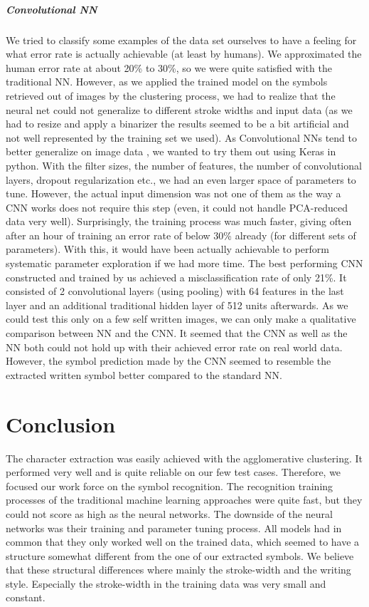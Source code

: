 \documentclass[twocolumn]{article}%
\begin{document}
	\subparagraph{Convolutional NN}
	We tried to classify some examples of the data set ourselves to have a feeling for what error rate is actually achievable (at least by humans). We approximated the human error rate at about 20\% to 30\%, so we were quite satisfied with the traditional NN. However, as we applied the trained model on the symbols retrieved out of images by the clustering process, we had to realize that the neural net could not generalize to different stroke widths and input data (as we had to resize and apply a binarizer the results seemed to be a bit artificial and not well represented by the training set we used). As Convolutional NNs tend to better generalize on image data \cite{lenet}, we wanted to try them out using Keras \cite{keras} in python. With the filter sizes, the number of features, the number of convolutional layers, dropout regularization etc., we had an even larger space of parameters to tune. However, the actual input dimension was not one of them as the way a CNN works does not require this step (even, it could not handle PCA-reduced data very well). Surprisingly, the training process was much faster, giving often after an hour of training an error rate of below 30\% already (for different sets of parameters). With this, it would have been actually achievable to perform systematic parameter exploration if we had more time. The best performing CNN constructed and trained by us achieved a misclassification rate of only 21\%. It consisted of 2 convolutional layers (using pooling) with 64 features in the last layer and an additional traditional hidden layer of 512 units afterwards.
	As we could test this only on a few self written images, we can only make a qualitative comparison between NN and the CNN. It seemed that the CNN as well as the NN both could not hold up with their achieved error rate on real world data. However, the symbol prediction made by the CNN seemed to resemble the extracted written symbol better compared to the standard NN.
	
	\section{Conclusion}
	
	The character extraction was easily achieved with the agglomerative clustering. It performed very well and is quite reliable on our few test cases. Therefore, we focused our work force on the symbol recognition. The recognition training processes of the traditional machine learning approaches were quite fast, but they could not score as high as the neural networks. The downside of the neural networks was their training and parameter tuning process. All models had in common that they only worked well on the trained data, which seemed to have a structure somewhat different from the one of our extracted symbols. We believe that these structural differences where mainly the stroke-width and the writing style. Especially the stroke-width in the training data was very small and constant.
	
\end{document}
